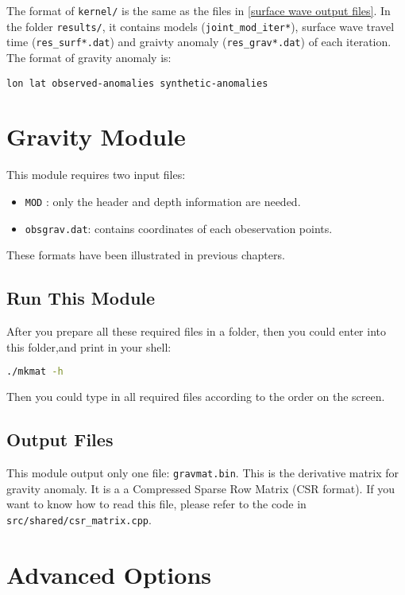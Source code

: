 \documentclass[UTF8]{article}
\begin{document}
The format of \verb!kernel/! is the same as the files
in \ref{surface wave output files}. In the folder \verb!results/!,
it contains models (\verb!joint_mod_iter*!), 
surface wave travel time (\verb!res_surf*.dat!) and 
graivty anomaly (\verb!res_grav*.dat!) 
of each iteration. The format of gravity anomaly is:
\begin{center}
    \texttt{lon lat observed-anomalies synthetic-anomalies}
\end{center}

\section{Gravity Module}
This module requires two input files:
\begin{itemize} 
    \item \texttt{MOD} : only the header and depth information are needed.
    \item \texttt{obsgrav.dat}: contains coordinates of each 
                     obeservation points.
\end{itemize}
These formats have been illustrated in previous chapters.

\subsection{Run This Module}
After you prepare all these required files in a folder,
then you could enter into this folder,and print in your shell:
\begin{lstlisting}[language=bash]
./mkmat -h
\end{lstlisting}
Then you could type in all required files according to 
the order on the screen.

\subsection{Output Files}\label{Gravity Matrix}
This module output only one file: \verb!gravmat.bin!. 
This is the derivative matrix for gravity anomaly. It is a 
a Compressed Sparse Row Matrix (CSR format). If you want to know how to read this file, please refer to the code in \texttt{src/shared/csr\_matrix.cpp}.


\section{Advanced Options}
\end{document}
